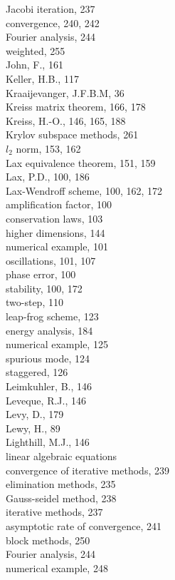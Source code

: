 \documentclass[10pt]{article}
\begin{document}
Jacobi iteration, 237\\
convergence, 240, 242\\
Fourier analysis, 244\\
weighted, 255\\
John, F., 161\\
Keller, H.B., 117\\
Kraaijevanger, J.F.B.M, 36\\
Kreiss matrix theorem, 166, 178\\
Kreiss, H.-O., 146, 165, 188\\
Krylov subspace methods, 261\\
\(l_{2}\) norm, 153, 162\\
Lax equivalence theorem, 151, 159\\
Lax, P.D., 100, 186\\
Lax-Wendroff scheme, 100, 162, 172\\
amplification factor, 100\\
conservation laws, 103\\
higher dimensions, 144\\
numerical example, 101\\
oscillations, 101, 107\\
phase error, 100\\
stability, 100, 172\\
two-step, 110\\
leap-frog scheme, 123\\
energy analysis, 184\\
numerical example, 125\\
spurious mode, 124\\
staggered, 126\\
Leimkuhler, B., 146\\
Leveque, R.J., 146\\
Levy, D., 179\\
Lewy, H., 89\\
Lighthill, M.J., 146\\
linear algebraic equations\\
convergence of iterative methods, 239\\
elimination methods, 235\\
Gauss-seidel method, 238\\
iterative methods, 237\\
asymptotic rate of convergence, 241\\
block methods, 250\\
Fourier analysis, 244\\
numerical example, 248\\
\end{document}
